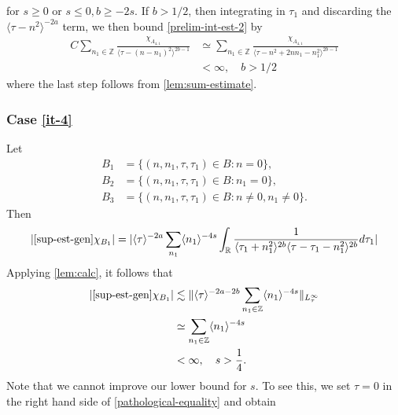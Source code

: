 \documentclass[12pt,reqno]{amsart}
\numberwithin{equation}{section}  %
\numberwithin{figure}{section}
\newcommand{\rr}{\mathbb{R}}
\newcommand{\zz}{\mathbb{Z}}
\theoremstyle{plain}
\theoremstyle{definition}
\theoremstyle{remark}
\begin{document}
%
%
for $s \ge 0$ or $s \le 0, b \ge -2s$. If $b > 1/2$, then integrating in
$\tau_{1}$ and discarding the  $\langle \tau - n^{2}  \rangle ^{-2a}$ term, we
then bound \eqref{prelim-int-est-2} by
%
%
\begin{equation*}
\begin{split}
  C \sum_{n_{1} \in \zz} \frac{\chi_{A_{4,1}}}{\langle \tau - (n -
  n_{1})^{2} \rangle ^{2b -1}}
  & \simeq
  \sum_{n_{1} \in \zz} \frac{\chi_{A_{4,1}}}{\langle \tau - n^{2} +
  2nn_{1} - n_{1}^{2}
  \rangle ^{2b -1}}
  \\
  & < \infty, \quad b > 1/2
\end{split}
\end{equation*}
%
%
where the last step follows from  \autoref{lem:sum-estimate}.
\subsubsection{Case \eqref{it-4}} 
\label{sssec:case-it-4}
Let 
%
%
\begin{align*}
B_1&=\{(n, n_1, \tau, \tau_1)\in B: n=0\},\\
B_2&=\{(n, n_1, \tau, \tau_1)\in B: n_1 = 0 \},\\
B_3&=\{(n, n_1, \tau, \tau_1)\in B: n \neq 0, n_1 \neq 0 \}.
\end{align*} 
%
%
Then 
%
%
\begin{equation}
  \label{pathological-equality}
\begin{split}
  |  \eqref{sup-est-gen} \chi_{B_{1}}| = | \langle \tau \rangle ^{-2a} \sum_{n_{1}} \langle
  n_{1}\rangle ^{-4s} \int_{\rr} \frac{1}{\langle \tau_{1} + n_{1}^{2} \rangle ^{2b}\langle
  \tau - \tau_{1} - n_{1}^{2}\rangle ^{2b}}d \tau_{1} |
\end{split}
\end{equation}
Applying \autoref{lem:calc}, it follows that
%
\begin{equation*}
\begin{split}
  |\eqref{sup-est-gen} \chi_{B_{1}} |  & \lesssim \| \langle \tau \rangle
  ^{-2a-2b} \sum_{n_{1} \in \zz} \langle n_{1} \rangle
  ^{-4s}  \|_{L^{\infty}_{\tau}}
  \\
  & \simeq \sum_{n_{1} \in \zz} \langle n_{1} \rangle ^{-4s}
  \\
  & < \infty, \quad s > \frac{1}{4}.
\end{split}
\end{equation*}
%
%
Note that we cannot improve our lower bound for $s$. To see this, we set $\tau = 0$
in the right hand side of \eqref{pathological-equality} and obtain
\end{document}
